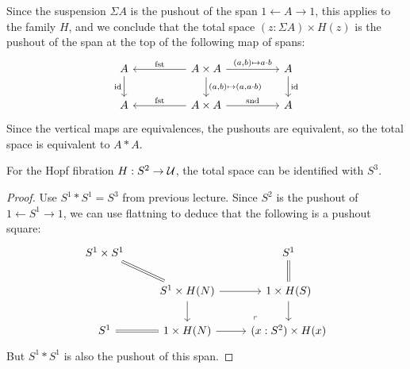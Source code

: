 \documentclass[10pt,oneside,leqno,openright]{memoir}
\begin{document}
Since the suspension $\Sigma A$ is the pushout of the span $1 \leftarrow A \to 1$,
this applies to the family $H$, and we conclude that the total space $(z:\Sigma A)\times H(z)$
is the pushout of the span at the top of the following map of spans:
\[
  \begin{tikzcd}[column sep=huge]
    A\ar[d,"\id"'] & A \times A\ar[l,"\fst"'] \ar[r,"{(a,b)\mapsto a\cdot b}"]
    \ar[d,"{(a,b)\mapsto (a,a\cdot b)}"] & A\ar[d,"\id"] \\
    A & A\times A\ar[l,"\fst"']\ar[r,"\snd"] & A
  \end{tikzcd}
\]
Since the vertical maps are equivalences, the pushouts are equivalent, so the total space is equivalent to $A*A$.
\begin{proposition}
  For the Hopf fibration $H: S^2 \to \mathcal{U}$, the total space can be identified with $S^3$.
\end{proposition}
\begin{proof}
  Use $S^1*S^1 = S^3$ from previous lecture. Since $S^2$ is the pushout of $1 \leftarrow S^1 \to 1$, we can use flattning to deduce that the following is a pushout square:
\[\begin{tikzcd}[ampersand replacement=\&]
	{S^1 \times S^1} \&\& {S^1} \\
	\& {S^1 \times H(N)} \& {1\times H(S)} \\
	{S^1} \& {1\times H(N)} \& {(x:S^2) \times H(x)}
	\arrow[equals, from=1-1, to=2-2]
	\arrow[from=2-2, to=2-3]
	\arrow[from=2-2, to=3-2]
	\arrow[equals, from=2-3, to=1-3]
	\arrow[from=2-3, to=3-3]
	\arrow[equals, from=3-2, to=3-1]
	\arrow[from=3-2, to=3-3]
	\arrow["\lrcorner"{anchor=center, pos=0.125, rotate=180}, draw=none, from=3-3, to=2-2]
\end{tikzcd}\]
But $S^1 * S^1$ is also the pushout of this span.
\end{proof}


\end{document}
